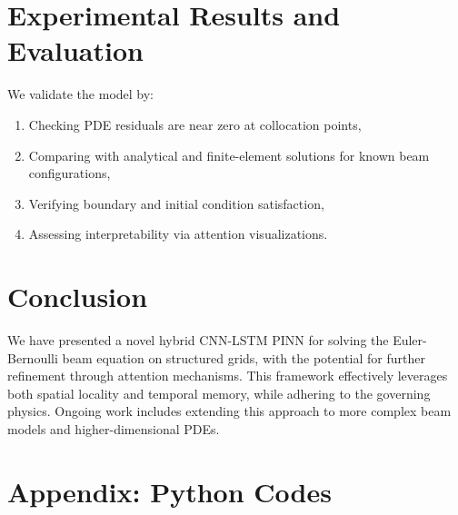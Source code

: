 \documentclass[Journal,letterpaper]{ascelike-new}
\begin{document}
\section{Experimental Results and Evaluation}
We validate the model by:
\begin{enumerate}
    \item Checking PDE residuals are near zero at collocation points,
    \item Comparing with analytical and finite-element solutions for known beam configurations,
    \item Verifying boundary and initial condition satisfaction,
    \item Assessing interpretability via attention visualizations.
\end{enumerate}

\section{Conclusion}
We have presented a novel hybrid CNN-LSTM PINN for solving the Euler-Bernoulli beam equation on structured grids, with the potential for further refinement through attention mechanisms. This framework effectively leverages both spatial locality and temporal memory, while adhering to the governing physics. Ongoing work includes extending this approach to more complex beam models and higher-dimensional PDEs.






%

\appendix

\section{Appendix: Python Codes}
\end{document}
